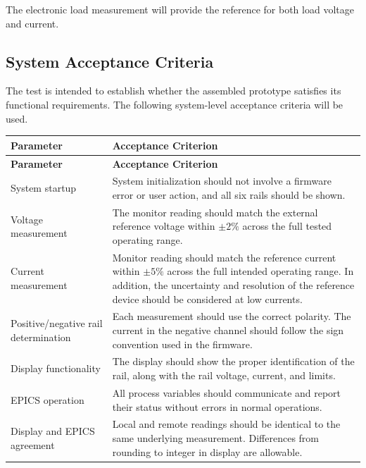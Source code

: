The electronic load measurement will provide the reference for both load voltage and current.

\subsection{System Acceptance Criteria}

The test is intended to establish whether the assembled prototype satisfies its
functional requirements. The following system-level acceptance criteria will be used.

\begin{longtable}{p{} p{}}
	\toprule
	\textbf{Parameter} & \textbf{Acceptance Criterion} \\
	\midrule
	\endfirsthead
	
	\toprule
	\textbf{Parameter} & \textbf{Acceptance Criterion} \\
	\midrule
	\endhead
	
	System startup &
	System initialization should not involve a firmware error or user action,
	and all six rails should be shown. \\
	
	Voltage measurement &
	The monitor reading should match the external reference voltage within
	\(\pm 2\%\) across the full tested operating range. \\
	
	Current measurement &
	Monitor reading should match the reference current within \(\pm 5\%\)
	across the full intended operating range. In addition, the uncertainty and
	resolution of the reference device should be considered at low currents. \\
	
	Positive/negative rail determination &
	Each measurement should use the correct polarity. The current in the negative
	channel should follow the sign convention used in the firmware. \\
	
	Display functionality &
	The display should show the proper identification of the rail, along with
	the rail voltage, current, and limits. \\
	
	EPICS operation &
	All process variables should communicate and report their status
	without errors in normal operations. \\
	
	Display and EPICS agreement &
	Local and remote readings should be identical to the same underlying
	measurement. Differences from rounding to integer in display are allowable. \\
	

\end{longtable}
